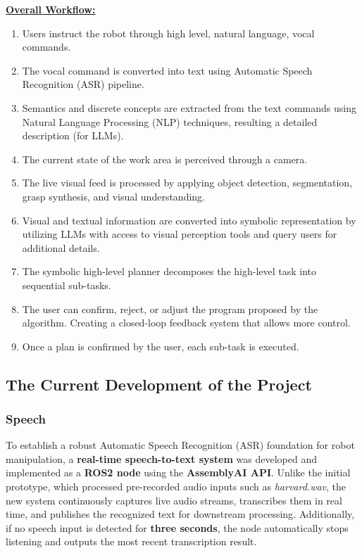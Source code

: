 \documentclass[12pt]{extarticle}
\begin{document}
\textbf{\underline{Overall Workflow:}}
\begin{enumerate}
    \item Users instruct the robot through high level, natural language, vocal commands.
    \item The vocal command is converted into text using Automatic Speech Recognition (ASR) pipeline.
    \item Semantics and discrete concepts are extracted from the text commands using Natural Language Processing (NLP) techniques, resulting a detailed description (for LLMs).
    \item The current state of the work area is perceived through a camera.
    \item The live visual feed is processed by applying object detection, segmentation, grasp synthesis, and visual understanding.
    \item Visual and textual information are converted into symbolic representation by utilizing LLMs with access to visual perception tools and query users for additional details.
    \item The symbolic high-level planner decomposes the high-level task into sequential sub-tasks.
    \item The user can confirm, reject, or adjust the program proposed by the algorithm. Creating a closed-loop feedback system that allows more control.
    \item Once a plan is confirmed by the user, each sub-task is executed.

\end{enumerate}

\subsection{The Current Development of the Project}

\subsubsection{Speech}
To establish a robust Automatic Speech Recognition (ASR) foundation for robot manipulation, a \textbf{real-time speech-to-text system} was developed and implemented as a \textbf{ROS2 node} using the \textbf{AssemblyAI API}. Unlike the initial prototype, which processed pre-recorded audio inputs such as \textit{harvard.wav}, the new system continuously captures live audio streams, transcribes them in real time, and publishes the recognized text for downstream processing. Additionally, if no speech input is detected for \textbf{three seconds}, the node automatically stops listening and outputs the most recent transcription result.
\end{document}
